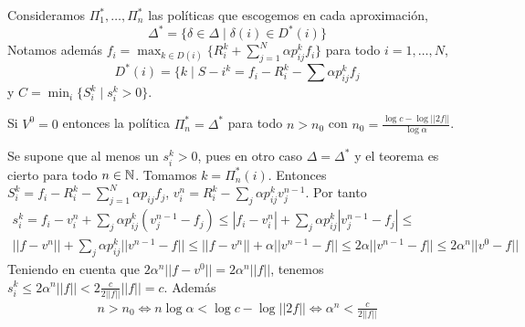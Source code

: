 \documentclass[MIOP.tex]{subfiles}
\begin{document}
Consideramos $\Pi_1^*, \dotsc, \Pi^*_n$ las políticas que escogemos en cada aproximación, $$\Delta^* = \{\delta \in \Delta \mid \delta(i)\in D^*(i)\}$$
Notamos además $f_i = \max_{k\in D(i)} \{R_i^k + \sum_{j=1}^N\alpha p_{ij}^k f_i\}$ para todo $i=1,\dotsc, N$,
$$ D^*(i)=\{ k\mid S-i ^k = f_i - R_i^k - \sum \alpha p_{ij}^kf_j$$
y $C=\min_i \{S_i^k \mid s_i^k >0\}$.
\begin{teorema}
Si $V^0 =0$ entonces la política $\Pi_n^* = \Delta^*$ para todo $n>n_0$ con $n_0 = \frac{\log c - \log ||2f||}{\log \alpha}$.
\end{teorema}
\begin{dem}
Se supone que al menos un $s_i^k>0$, pues en otro caso $\Delta = \Delta^*$ y el teorema es cierto para todo $n\in\mathbb{N}$. Tomamos $k=\Pi^*_n(i)$. Entonces $S_i^k = f_i - R^k_i - \sum_{j=1}^N \alpha p_{ij}f_j$, $v_i^n = R^k_i - \sum_j \alpha p_{ij}^kv_j^{n-1}$. Por tanto
\begin{gather*}
s_i^k = f_i-v_i^n + \sum_j \alpha p_{ij}^k(v_j^{n-1}-f_j) \leq |f_i - v_i^n|+\sum_j \alpha p_{ij}^k|v_j^{n-1}-f_j| \leq \\
||f-v^n|| + \sum_j \alpha p_{ij}^k
||v^{n-1}-f|| \leq ||f-v^n|| + \alpha ||v^{n-1}-f||  \leq 2 \alpha ||v^{n-1}-f|| \leq 2\alpha^n ||v^0-f||
\end{gather*}
Teniendo en cuenta que $2\alpha^n ||f-v^0|| = 2\alpha^n ||f||$, tenemos $s_i^k \leq 2\alpha^n ||f||<2\frac{c}{2||f||}||f|| = c$. Además
\begin{gather*}
n > n_0 \Leftrightarrow n\log \alpha <\log c - \log ||2f|| \Leftrightarrow \alpha^n < \frac{c}{2||f||}
\end{gather*}

\end{dem}
\end{document}
